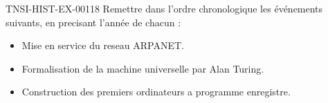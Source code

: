 \begin{exercice}{TNSI-HIST-EX-001}{1}{8}
Remettre dans l'ordre chronologique les événements suivants, en precisant l'année de chacun :
\begin{itemize}
  \item Mise en service du reseau ARPANET.
  \item Formalisation de la machine universelle par Alan Turing.
  \item Construction des premiers ordinateurs a programme enregistre.
\end{itemize}
\end{exercice}
